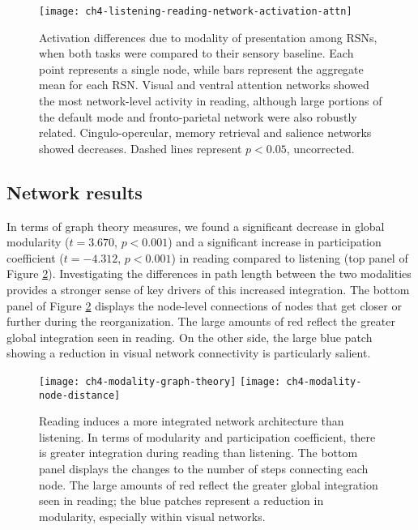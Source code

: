\begin{figure}[t]
	\centering
	\texttt{[image: ch4-listening-reading-network-activation-attn]}
    \caption[Activation differences due to modality of presentation among RSNs]{Activation differences due to modality of presentation among RSNs, when both tasks were compared to their sensory baseline. Each point represents a single node, while bars represent the aggregate mean for each RSN. Visual and ventral attention networks showed the most network-level activity in reading, although large portions of the default mode and fronto-parietal network were also robustly related. Cingulo-opercular, memory retrieval and salience networks showed decreases. Dashed lines represent $p < 0.05$, uncorrected.}
	\label{fig:ch4-listening-reading-network-activation-attn}
\end{figure}

\subsection{Network results}

In terms of graph theory measures, we found a significant decrease in global modularity ($t = 3.670$, $p < 0.001$) and a significant increase in participation coefficient ($t = -4.312$, $p < 0.001$) in reading compared to listening (top panel of Figure \ref{fig:ch4-modality-graph-theory}). Investigating the differences in path length between the two modalities provides a stronger sense of key drivers of this increased integration. The bottom panel of Figure \ref{fig:ch4-modality-graph-theory} displays the node-level connections of nodes that get closer or further during the reorganization. The large amounts of red reflect the greater global integration seen in reading. On the other side, the large blue patch showing a reduction in visual network connectivity is particularly salient.

\begin{figure}[t!]
	\centering
	\texttt{[image: ch4-modality-graph-theory]}
	\texttt{[image: ch4-modality-node-distance]}
    \caption[Reading induces a more integrated network architecture than listening]{Reading induces a more integrated network architecture than listening. In terms of modularity and participation coefficient, there is greater integration during reading than listening. The bottom panel displays the changes to the number of steps connecting each node. The large amounts of red reflect the greater global integration seen in reading; the blue patches represent a reduction in modularity, especially within visual networks.}
	\label{fig:ch4-modality-graph-theory}
\end{figure}


